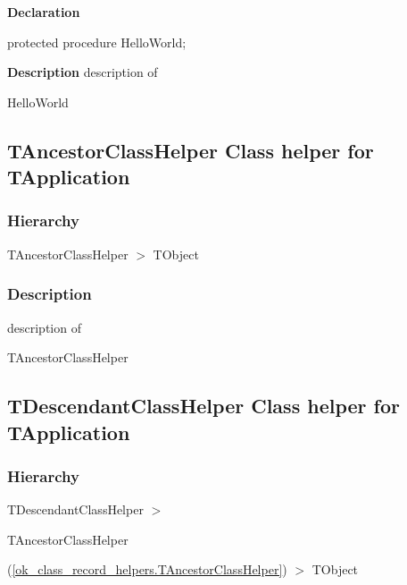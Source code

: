\documentclass{report}
\begin{document}
\begin{list}{}{
\setlength{\itemindent}{0cm}
\setlength{\listparindent}{0cm}
\setlength{\leftmargin}{\evensidemargin}
\addtolength{\leftmargin}{\tmplength}
\settowidth{\labelsep}{X}
\addtolength{\leftmargin}{\labelsep}
\setlength{\labelwidth}{\tmplength}
}
\begin{flushleft}
\item[\textbf{Declaration}\hfill]
\begin{ttfamily}
protected procedure HelloWorld;\end{ttfamily}


\end{flushleft}
\par
\item[\textbf{Description}]
description of \begin{ttfamily}HelloWorld\end{ttfamily}

\end{list}
\subsection*{TAncestorClassHelper Class helper for TApplication}
\subsubsection*{\large{\textbf{Hierarchy}}\normalsize\hspace{1ex}\hfill}
TAncestorClassHelper {$>$} TObject
\subsubsection*{\large{\textbf{Description}}\normalsize\hspace{1ex}\hfill}
description of \begin{ttfamily}TAncestorClassHelper\end{ttfamily}\subsection*{TDescendantClassHelper Class helper for TApplication}
\subsubsection*{\large{\textbf{Hierarchy}}\normalsize\hspace{1ex}\hfill}
TDescendantClassHelper {$>$} \begin{ttfamily}TAncestorClassHelper\end{ttfamily}(\ref{ok_class_record_helpers.TAncestorClassHelper}) {$>$} 
TObject
\end{document}

